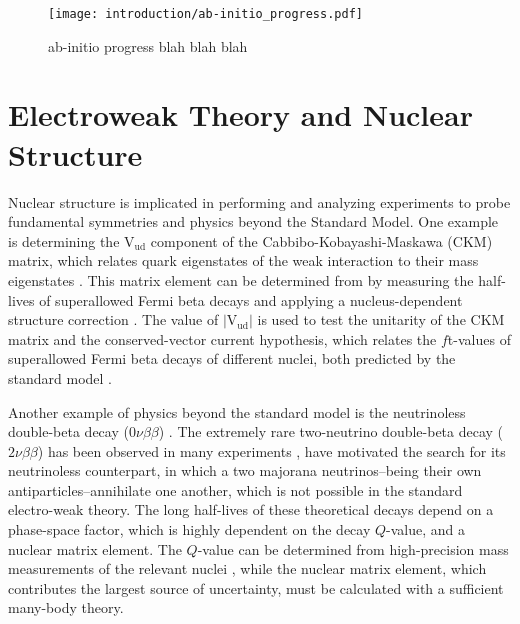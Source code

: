 \documentclass[../thesis.tex]{subfiles}
\begin{document}
\begin{figure}
  \centering
  \texttt{[image: introduction/ab-initio\_progress.pdf]}
  \caption{ab-initio progress blah blah blah}
  \label{fig:AbInitioProgress}
\end{figure}



\section{Electroweak Theory and Nuclear Structure}

Nuclear structure is implicated in performing and analyzing experiments to probe fundamental symmetries and physics beyond the Standard Model. One example is determining the $\mathrm{V_{ud}}$ component of the Cabbibo-Kobayashi-Maskawa (CKM) matrix, which relates quark eigenstates of the weak interaction to their mass eigenstates \cite{CABBIBO1963531,KOBAYASHI1973652}. This matrix element can be determined from by measuring the half-lives of superallowed Fermi beta decays \cite{TOWNER2003197} and applying a nucleus-dependent structure correction \cite{TOWNER2008025501,TOWNER199413,TOWNER1992478,BARKER1992501,JAUS1990166}. The value of $\left|\mathrm{V_{ud}}\right|$ is used to test the unitarity of the CKM matrix and the conserved-vector current hypothesis, which relates the $f$t-values of superallowed Fermi beta decays of different nuclei, both predicted by the standard model \cite{HARDY2005055501}.

Another example of physics beyond the standard model is the neutrinoless double-beta decay ($0\nu\beta\beta$) \cite{SUHONEN1998123,AVIGNONE2008481}. The extremely rare two-neutrino double-beta decay ($2\nu\beta\beta$) has been observed in many experiments \cite{ELLIOTT19872020,MILEY19903092}, have motivated the search for its neutrinoless counterpart, in which a two majorana neutrinos--being their own antiparticles--annihilate one another, which is not possible in the standard electro-weak theory. The long half-lives of these theoretical decays depend on a phase-space factor, which is highly dependent on the decay $Q$-value, and a nuclear matrix element. The $Q$-value can be determined from high-precision mass measurements of the relevant nuclei \cite{LINCOLN2013012501,GULYUZ2015055501,REDSHAW2012041306,BUSTABAD2013022501}, while the nuclear matrix element, which contributes the largest source of uncertainty, must be calculated with a sufficient many-body theory. 
\end{document}
